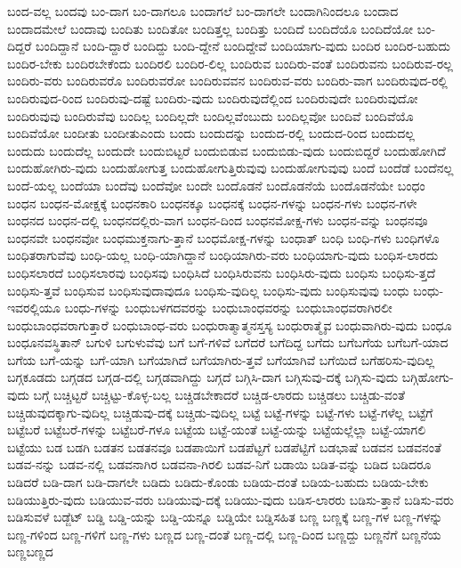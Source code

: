 {ಬಂದ-ವಲ್ಲ
ಬಂದವು
ಬಂ-ದಾಗ
ಬಂ-ದಾಗಲೂ
ಬಂದಾಗಲೆ
ಬಂ-ದಾಗಲೇ
ಬಂದಾಗಿನಿಂದಲೂ
ಬಂದಾದ
ಬಂದಾದಮೇಲೆ
ಬಂದಾವು
ಬಂದಿತು
ಬಂದಿತೋ
ಬಂದಿತ್ತಲ್ಲ
ಬಂದಿತ್ತು
ಬಂದಿದೆ
ಬಂದಿದೆಯೊ
ಬಂದಿದೆಯೋ
ಬಂ-ದಿದ್ದರೆ
ಬಂದಿದ್ದಾನೆ
ಬಂದಿ-ದ್ದಾರೆ
ಬಂದಿದ್ದು
ಬಂದಿ-ದ್ದೇನೆ
ಬಂದಿದ್ದೇವೆ
ಬಂದಿಯಾಗು-ವುದು
ಬಂದಿರ
ಬಂದಿರ-ಬಹುದು
ಬಂದಿರ-ಬೇಕು
ಬಂದಿರಬೇಕೆಂದು
ಬಂದಿರಲಿ
ಬಂದಿರ-ಲಿಲ್ಲ
ಬಂದಿರುವ
ಬಂದಿರು-ವಂತೆ
ಬಂದಿರುವನು
ಬಂದಿರುವ-ರಲ್ಲ
ಬಂದಿರು-ವರು
ಬಂದಿರುವರೊ
ಬಂದಿರುವರೋ
ಬಂದಿರುವವನ
ಬಂದಿರುವ-ವರು
ಬಂದಿರು-ವಾಗ
ಬಂದಿರುವುದ-ರಲ್ಲಿ
ಬಂದಿರುವುದ-ರಿಂದ
ಬಂದಿರುವು-ದಷ್ಟೆ
ಬಂದಿರು-ವುದು
ಬಂದಿರುವುದೆಲ್ಲಿಂದ
ಬಂದಿರುವುದೇ
ಬಂದಿರುವುದೋ
ಬಂದಿರುವುವು
ಬಂದಿರುವೆವು
ಬಂದಿಲ್ಲ
ಬಂದಿಲ್ಲದೇ
ಬಂದಿಲ್ಲವೆಂಬುದು
ಬಂದಿಲ್ಲವೋ
ಬಂದಿವೆ
ಬಂದಿವೆಯೊ
ಬಂದಿವೆಯೋ
ಬಂದೀತು
ಬಂದೀತುಎಂದು
ಬಂದು
ಬಂದುದನ್ನು
ಬಂದುದ-ರಲ್ಲಿ
ಬಂದುದ-ರಿಂದ
ಬಂದುದಲ್ಲ
ಬಂದುದು
ಬಂದುದೆಲ್ಲ
ಬಂದುದೇ
ಬಂದುಬಿಟ್ಟರೆ
ಬಂದುಬಿಡುವ
ಬಂದುಬಿಡು-ವುದು
ಬಂದುಬಿದ್ದರೆ
ಬಂದುಹೋಗಿದೆ
ಬಂದುಹೋಗಿರು-ವುದು
ಬಂದುಹೋಗುತ್ತ
ಬಂದುಹೋಗುತ್ತಿರುವುವು
ಬಂದುಹೋಗುವುವು
ಬಂದೆ
ಬಂದೆಡೆ
ಬಂದೆನಲ್ಲ
ಬಂದೆ-ಯಲ್ಲ
ಬಂದೆಯಾ
ಬಂದೆವು
ಬಂದೆವೋ
ಬಂದೇ
ಬಂದೊಡನೆ
ಬಂದೊಡನೆಯೆ
ಬಂದೊಡನೆಯೇ
ಬಂಧಂ
ಬಂಧನ
ಬಂಧನ-ಮೋಕ್ಷಕ್ಕೆ
ಬಂಧನಕಾರಿ
ಬಂಧನಕ್ಕೂ
ಬಂಧನಕ್ಕೆ
ಬಂಧನ-ಗಳನ್ನು
ಬಂಧನ-ಗಳು
ಬಂಧನ-ಗಳೇ
ಬಂಧನದ
ಬಂಧನ-ದಲ್ಲಿ
ಬಂಧನದಲ್ಲಿರು-ವಾಗ
ಬಂಧನ-ದಿಂದ
ಬಂಧನಮೋಕ್ಷ-ಗಳು
ಬಂಧನ-ವನ್ನು
ಬಂಧನವೂ
ಬಂಧನವೇ
ಬಂಧನವೋ
ಬಂಧಮುಕ್ತನಾಗು-ತ್ತಾನೆ
ಬಂಧಮೋಕ್ಷ-ಗಳನ್ನು
ಬಂಧಾತ್
ಬಂಧಿ
ಬಂಧಿ-ಗಳು
ಬಂಧಿಗಳೊ
ಬಂಧಿತರಾಗುವೆವು
ಬಂಧಿ-ಯಲ್ಲ
ಬಂಧಿ-ಯಾಗಿದ್ದಾನೆ
ಬಂಧಿಯಾಗಿರು-ವರು
ಬಂಧಿಯಾಗು-ವುದು
ಬಂಧಿಸ-ಲಾರದು
ಬಂಧಿಸಲಾರದೆ
ಬಂಧಿಸಲಾರವು
ಬಂಧಿಸವು
ಬಂಧಿಸಿದೆ
ಬಂಧಿಸಿರುವನು
ಬಂಧಿಸಿರು-ವುದು
ಬಂಧಿಸು
ಬಂಧಿಸು-ತ್ತದೆ
ಬಂಧಿಸು-ತ್ತವೆ
ಬಂಧಿಸುವ
ಬಂಧಿಸುವುದಾವುದೂ
ಬಂಧಿಸು-ವುದಿಲ್ಲ
ಬಂಧಿಸು-ವುದು
ಬಂಧಿಸುವುವು
ಬಂಧು
ಬಂಧು-ಇವರಲ್ಲಿಯೂ
ಬಂಧು-ಗಳನ್ನು
ಬಂಧುಬಳಗದವರನ್ನು
ಬಂಧುಬಾಂಧವರನ್ನು
ಬಂಧುಬಾಂಧವರಾಗಿರಲೀ
ಬಂಧುಬಾಂಧವರಾಗುತ್ತಾರೆ
ಬಂಧುಬಾಂಧ-ವರು
ಬಂಧುರಾತ್ಮಾತ್ಮನಸ್ತಸ್ಯ
ಬಂಧುರಾತ್ಮೈವ
ಬಂಧುವಾಗಿರು-ವುದು
ಬಂಧೂ
ಬಂಧೂನವಸ್ಥಿತಾನ್
ಬಗುಳಿ
ಬಗುಳುವೆವು
ಬಗೆ
ಬಗೆ-ಗಳಿವೆ
ಬಗೆದರೆ
ಬಗೆದಿದ್ದ
ಬಗೆದು
ಬಗೆಬಗೆಯ
ಬಗೆಬಗೆ-ಯಾದ
ಬಗೆಯ
ಬಗೆ-ಯನ್ನು
ಬಗೆ-ಯಾಗಿ
ಬಗೆಯಾಗಿದೆ
ಬಗೆಯಾಗಿರು-ತ್ತವೆ
ಬಗೆಯಾಗಿವೆ
ಬಗೆಯಿದೆ
ಬಗೆಹರಿಸು-ವುದಿಲ್ಲ
ಬಗ್ಗಕೂಡದು
ಬಗ್ಗಡದ
ಬಗ್ಗಡ-ದಲ್ಲಿ
ಬಗ್ಗಡವಾಗಿದ್ದು
ಬಗ್ಗದೆ
ಬಗ್ಗಿಸಿ-ದಾಗ
ಬಗ್ಗಿಸುವು-ದಕ್ಕೆ
ಬಗ್ಗಿಸು-ವುದು
ಬಗ್ಗಿಹೋಗು-ವುದು
ಬಗ್ಗೆ
ಬಚ್ಚಿಟ್ಟರೆ
ಬಚ್ಚಿಟ್ಟು-ಕೊಳ್ಳ-ಬಲ್ಲ
ಬಚ್ಚಿಡಬೇಕಾದರೆ
ಬಚ್ಚಿಡ-ಲಾರದು
ಬಚ್ಚಿಡಲು
ಬಚ್ಚಿಡು-ವಂತೆ
ಬಚ್ಚಿಡುವುದಕ್ಕಾಗು-ವುದಿಲ್ಲ
ಬಚ್ಚಿಡುವು-ದಕ್ಕೆ
ಬಚ್ಚಿಡು-ವುದಿಲ್ಲ
ಬಟ್ಟೆ
ಬಟ್ಟೆ-ಗಳನ್ನು
ಬಟ್ಟೆ-ಗಳು
ಬಟ್ಟೆ-ಗಳೆಲ್ಲ
ಬಟ್ಟೆಗೆ
ಬಟ್ಟೆಬರೆ
ಬಟ್ಟೆಬರೆ-ಗಳನ್ನು
ಬಟ್ಟೆಬರೆ-ಗಳೂ
ಬಟ್ಟೆಯ
ಬಟ್ಟೆ-ಯಂತೆ
ಬಟ್ಟೆ-ಯನ್ನು
ಬಟ್ಟೆಯಲ್ಲೆಲ್ಲಾ
ಬಟ್ಟೆ-ಯಾಗಲಿ
ಬಟ್ಟೆಯು
ಬಡ
ಬಡಗಿ
ಬಡತನ
ಬಡತನವೂ
ಬಡಪಾಯಿಗೆ
ಬಡಪೆಟ್ಟಗೆ
ಬಡಪೆಟ್ಟಿಗೆ
ಬಡಭಾಷೆ
ಬಡವನ
ಬಡವನಂತೆ
ಬಡವ-ನನ್ನು
ಬಡವ-ನಲ್ಲಿ
ಬಡವನಾಗಿರ
ಬಡವನಾ-ಗಿರಲಿ
ಬಡವ-ನಿಗೆ
ಬಡಾಯಿ
ಬಡಿತ-ವನ್ನು
ಬಡಿದ
ಬಡಿದರೂ
ಬಡಿದರೆ
ಬಡಿ-ದಾಗ
ಬಡಿ-ದಾಗಲೇ
ಬಡಿದು
ಬಡಿದು-ಕೊಂಡು
ಬಡಿಯ-ದಂತೆ
ಬಡಿಯ-ಬಹುದು
ಬಡಿಯ-ಬೇಕು
ಬಡಿಯುತ್ತಿರು-ವುದು
ಬಡಿಯುವ-ವರು
ಬಡಿಯುವು-ದಕ್ಕೆ
ಬಡಿಯು-ವುದು
ಬಡಿಸ-ಲಾರರು
ಬಡಿಸು-ತ್ತಾನೆ
ಬಡಿಸು-ವರು
ಬಡಿಸುವಳೆ
ಬಡ್ಜೆಟ್
ಬಡ್ಡಿ
ಬಡ್ಡಿ-ಯನ್ನು
ಬಡ್ಡಿ-ಯನ್ನೂ
ಬಡ್ಡಿಯೇ
ಬಡ್ಡಿಸಹಿತ
ಬಣ್ಣ
ಬಣ್ಣಕ್ಕೆ
ಬಣ್ಣ-ಗಳ
ಬಣ್ಣ-ಗಳನ್ನು
ಬಣ್ಣ-ಗಳಿಂದ
ಬಣ್ಣ-ಗಳಿಗೆ
ಬಣ್ಣ-ಗಳು
ಬಣ್ಣದ
ಬಣ್ಣ-ದಂತೆ
ಬಣ್ಣ-ದಲ್ಲಿ
ಬಣ್ಣ-ದಿಂದ
ಬಣ್ಣದ್ದು
ಬಣ್ಣನೆಗೆ
ಬಣ್ಣನೆಯ
ಬಣ್ಣಬಣ್ಣದ
}
